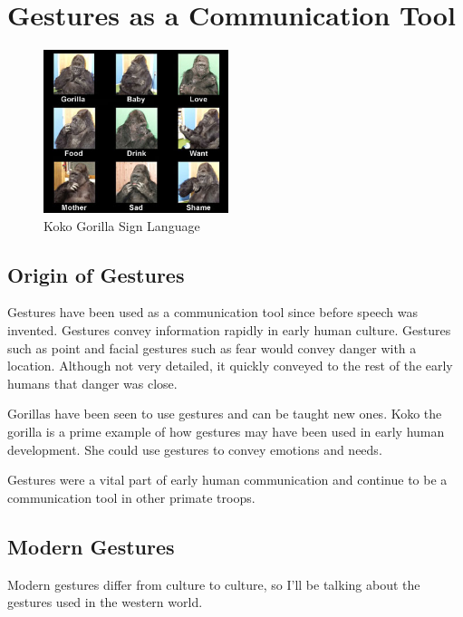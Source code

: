\chapter{Gestures as a Communication Tool}

\begin{figure}
  \begin{center}
    \includegraphics[width=0.48\textwidth]{img/gorillagesture.jpg}
  \end{center}
  \caption{Koko Gorilla Sign Language}
\end{figure}

\section{Origin of Gestures}
Gestures have been used as a communication tool since before speech was invented. Gestures convey information rapidly in early human culture. \cite{nonverbalgesture} Gestures such as point and facial gestures such as fear would convey danger with a location. Although not very detailed, it quickly conveyed to the rest of the early humans that danger was close. \cite{nonverbalgesture}

Gorillas have been seen to use gestures and can be taught new ones. Koko the gorilla is a prime example of how gestures may have been used in early human development. She could use gestures to convey emotions and needs. \cite{koko}

Gestures were a vital part of early human communication and continue to be a communication tool in other primate troops.

\section{Modern Gestures}
Modern gestures differ from culture to culture, so I'll be talking about the gestures used in the western world.

